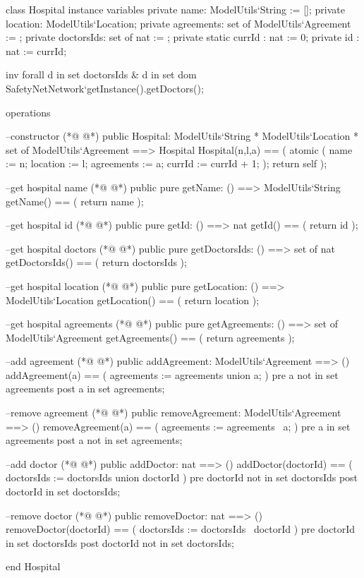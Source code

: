 \begin{vdmpp}[breaklines=true]
class Hospital
instance variables
 private name: ModelUtils`String := [];
 private location: ModelUtils`Location;
 private agreements: set of ModelUtils`Agreement := {};
 private doctorsIds: set of nat := {};
 private static currId : nat := 0;
 private id : nat := currId;
 
 inv forall d in set doctorsIds & d in set dom SafetyNetNetwork`getInstance().getDoctors();
 
operations

 --constructor
(*@
\label{Hospital:15}
@*)
 public Hospital: ModelUtils`String * ModelUtils`Location * set of ModelUtils`Agreement ==> Hospital
 Hospital(n,l,a) == (
  atomic (
   name := n;
   location := l;
   agreements := a;
   currId := currId + 1;
  ); 
  return self 
 );

 --get hospital name 
(*@
\label{getName:27}
@*)
 public pure getName: () ==> ModelUtils`String
 getName() == (
  return name
 );
 
 --get hospital id
(*@
\label{getId:33}
@*)
 public pure getId: () ==> nat
 getId() == (
  return id
 );
 
 --get hospital doctors
(*@
\label{getDoctorsIds:39}
@*)
 public pure getDoctorsIds: () ==> set of nat
 getDoctorsIds() == (
  return doctorsIds
 );
 
 --get hospital location
(*@
\label{getLocation:45}
@*)
 public pure getLocation: () ==> ModelUtils`Location
 getLocation() == (
  return location
 );
 
 --get hospital agreements
(*@
\label{getAgreements:51}
@*)
 public pure getAgreements: () ==> set of ModelUtils`Agreement
 getAgreements() == (
  return agreements
 );
 
 --add agreement
(*@
\label{addAgreement:57}
@*)
 public addAgreement: ModelUtils`Agreement ==> ()
 addAgreement(a) == (
  agreements := agreements union {a};
 )
 pre a not in set agreements
 post a in set agreements; 
 
 
 --remove agreement
(*@
\label{removeAgreement:66}
@*)
 public removeAgreement: ModelUtils`Agreement ==> ()
 removeAgreement(a) == (
  agreements := agreements \ {a};
 )
 pre a in set agreements
 post a not in set agreements; 
 
 --add doctor
(*@
\label{addDoctor:74}
@*)
 public addDoctor: nat ==> ()
 addDoctor(doctorId) == (
  doctorsIds := doctorsIds union {doctorId}
 )
 pre doctorId not in set doctorsIds
 post doctorId in set doctorsIds; 

 
 --remove doctor 
(*@
\label{removeDoctor:83}
@*)
 public removeDoctor: nat ==> ()
 removeDoctor(doctorId) == (
  doctorsIds := doctorsIds \ {doctorId}
 )
 pre doctorId in set doctorsIds
 post doctorId not in set doctorsIds; 

end Hospital
\end{vdmpp}
